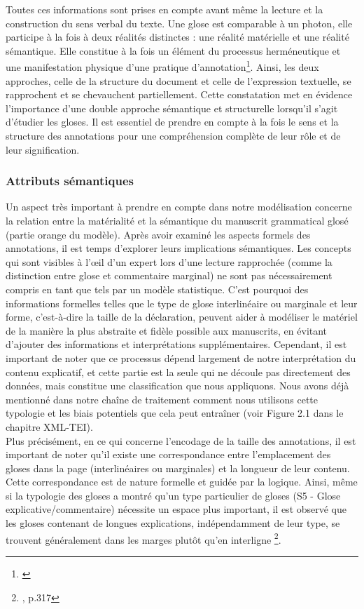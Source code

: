 \documentclass[a4paper, twoside, 12pt]{book}
\begin{document}
{Toutes ces informations sont prises en compte avant même la lecture et la construction du sens verbal du texte. Une glose est comparable à un photon, elle participe à la fois à deux réalités distinctes : une réalité matérielle et une réalité sémantique. Elle constitue à la fois un élément du processus herméneutique et une manifestation physique d'une pratique d'annotation\footnote{\cite{blom2023glossing}}. Ainsi, les deux approches, celle de la \og{}structure du document\fg{} et celle de \og{}l'expression textuelle\fg{}, se rapprochent et se chevauchent partiellement. Cette constatation met en évidence l'importance d'une double approche sémantique et structurelle lorsqu'il s'agit d'étudier les gloses. Il est essentiel de prendre en compte à la fois le sens et la structure des annotations pour une compréhension complète de leur rôle et de leur signification.

\subsubsection{Attributs sémantiques}

Un aspect très important à prendre en compte dans notre modélisation concerne la relation entre la matérialité et la sémantique du manuscrit grammatical glosé (partie orange du modèle). Après avoir examiné les aspects formels des annotations, il est temps d'explorer leurs implications sémantiques. Les concepts qui sont visibles à l'œil d'un expert lors d'une lecture rapprochée (comme la distinction entre glose et commentaire marginal) ne sont pas nécessairement compris en tant que tels par un modèle statistique. C'est pourquoi des informations formelles telles que le \og{}type\fg{} de glose interlinéaire ou marginale et leur \og{}forme\fg{}, c'est-à-dire la taille de la déclaration, peuvent aider à modéliser le matériel de la manière la plus abstraite et fidèle possible aux manuscrits, en évitant d'ajouter des informations et interprétations supplémentaires. Cependant, il est important de noter que ce processus dépend largement de notre interprétation du contenu explicatif, et cette partie est la seule qui ne découle pas directement des données, mais constitue une classification que nous appliquons. Nous avons déjà mentionné dans notre chaîne de traitement comment nous utilisons cette typologie et les biais potentiels que cela peut entraîner (voir Figure 2.1 dans le chapitre XML-TEI).\\

Plus précisément, en ce qui concerne l'encodage de la taille des annotations, il est important de noter qu'il existe une correspondance entre l'emplacement des gloses dans la page (interlinéaires ou marginales) et la longueur de leur contenu. Cette correspondance est de nature formelle et guidée par la logique. Ainsi, même si la typologie des gloses a montré qu'un type particulier de gloses (S5 - Glose explicative/commentaire) nécessite un espace plus important, il est observé que les gloses contenant de longues explications, indépendamment de leur type, se trouvent généralement dans les marges plutôt qu'en interligne \footnote{\cite{cinato2015priscien}, p.317}.

}
\end{document}

